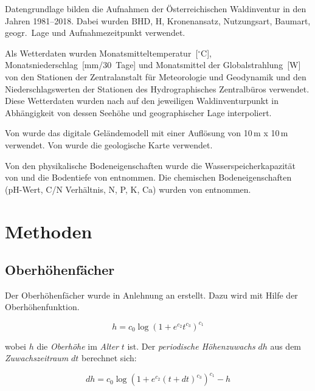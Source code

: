 \documentclass[twocolumn]{scrartcl}
\begin{document}
Datengrundlage bilden die Aufnahmen der Österreichischen Waldinventur
\citep{hauk2009waldinventur} in den Jahren 1981--2018. Dabei wurden
BHD, H, Kronenansatz, Nutzungsart, Baumart, geogr.\ Lage und
Aufnahmezeitpunkt verwendet.

Als Wetterdaten wurden Monatsmitteltemperatur~[$^{\circ}$C],
Monatsniederschlag~[mm/30~Tage] und Monatsmittel der
Globalstrahlung~[W] von den Stationen der Zentralanstalt für
Meteorologie und Geodynamik und den Niederschlagswerten der Stationen
des Hydrographisches Zentralbüros verwendet. Diese Wetterdaten wurden
nach \cite{kindermann2010jahrringanalyse} auf den jeweiligen
Waldinventurpunkt in Abhängigkeit von dessen Seehöhe und
geographischer Lage interpoliert.

Von \cite{geoland2021dgm} wurde das digitale Geländemodell mit einer
Auflösung von 10\,m x 10\,m verwendet. Von \cite{geologie2015} wurde
die geologische Karte verwendet.

Von den physikalische Bodeneigenschaften wurde die
Wasserspeicherkapazität von \cite{Ballabio2016soilPhysical} und die
Bodentiefe von \cite{Hengl2017soilgrids} entnommen. Die chemischen
Bodeneigenschaften (pH-Wert, C/N Verhältnis, N, P, K, Ca) wurden von
\cite{Ballabio2019soilChemical} entnommen.

\section{Methoden}

\subsection{Oberhöhenfächer}

Der Oberhöhenfächer wurde in Anlehnung an
\cite{kindermann2018siteIndexCurves} erstellt.
Dazu wird mit Hilfe der Oberhöhenfunktion.

\begin{equation}
  \label{eq:ohFun}
  h = c_0 \log(1 + e^{c_2}t^{c_3})^{c_1}
\end{equation}

wobei $h$ die \emph{Oberhöhe} im \emph{Alter} $t$ ist. Der \emph{periodische
Höhenzuwachs} $dh$ aus dem \emph{Zuwachszeitraum} $dt$ berechnet sich:

\begin{equation}
  \label{eq:ohFunDhT}
  dh = c_0 \log(1 + e^{c_2}(t + dt)^{c_3})^{c_1} - h
\end{equation}
\end{document}
